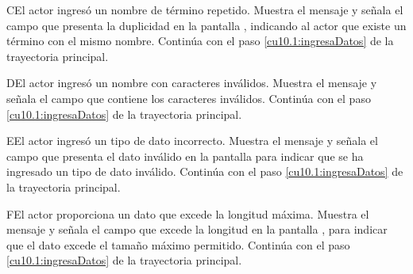  \begin{UCtrayectoriaA}{C}{El actor ingresó un nombre de término repetido.}
    \UCpaso[\UCsist] Muestra el mensaje  y señala el campo que presenta la duplicidad en la pantalla 
	    , indicando al actor que existe un término con el mismo nombre.
    \UCpaso[] Continúa con el paso \ref{cu10.1:ingresaDatos} de la trayectoria principal.
 \end{UCtrayectoriaA}
 \begin{UCtrayectoriaA}{D}{El actor ingresó un nombre con caracteres inválidos.}
    \UCpaso[\UCsist] Muestra el mensaje  y señala el campo que contiene los caracteres inválidos.
    \UCpaso[] Continúa con el paso \ref{cu10.1:ingresaDatos} de la trayectoria principal.
 \end{UCtrayectoriaA}
 \begin{UCtrayectoriaA}{E}{El actor ingresó un tipo de dato incorrecto.}
    \UCpaso[\UCsist] Muestra el mensaje  y señala el campo que presenta el dato inválido en la 
    pantalla  para indicar que se ha ingresado un tipo de dato inválido.
    \UCpaso[] Continúa con el paso \ref{cu10.1:ingresaDatos} de la trayectoria principal.
 \end{UCtrayectoriaA}
 \begin{UCtrayectoriaA}{F}{El actor proporciona un dato que excede la longitud máxima.}
    \UCpaso[\UCsist] Muestra el mensaje  y señala el campo que excede la 
    longitud en la pantalla , para indicar que el dato excede el tamaño máximo permitido.
    \UCpaso[] Continúa con el paso \ref{cu10.1:ingresaDatos} de la trayectoria principal.
 \end{UCtrayectoriaA}
 